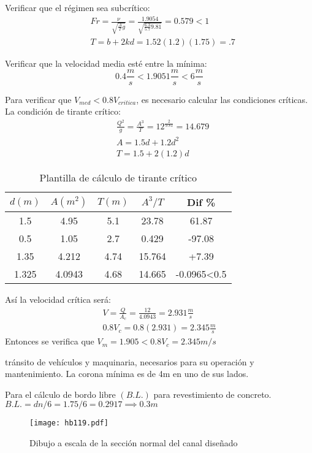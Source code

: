 Verificar que el régimen sea subcrítico:
\begin{align*}
    &Fr = \frac{\nu}{\sqrt{\frac{A}{T}g}} = \frac{1.9054}{\sqrt{ \frac{6.3}{5.7}9.81}} = 0.579 < 1\\
    &T = b + 2kd = 1.5 2(1.2)(1.75) = .7
\end{align*}

Verificar que la velocidad media esté entre la mínima:
\begin{equation*}
    0.4\frac{m}{s} < 1.9051 \frac{m}{s} < 6 \frac{m}{s}
\end{equation*}

Para verificar que $V_{med}<0.8 V_{critica}$, es necesario calcular las condiciones críticas.
    La condición de tirante crítico:
\begin{align*}
    &\frac{Q^2}{g} = \frac{A^3}{T} = 12^\frac{2}{9.81} = 14.679\\
    &A =1.5d + 1.2d^2\\
    &T = 1.5 + 2(1.2)d
\end{align*}
\begin{table}[h!]
    \centering
    \begin{tabular}{@{}ccccc@{}}
    \toprule
    $d(m)$ & $A(m^2)$ & $T(m)$ & $A^3/T$ & Dif \%      \\ \midrule
    1.5    & 4.95     & 5.1    & 23.78   & 61.87       \\
    0.5    & 1.05     & 2.7    & 0.429   & -97.08      \\
    1.35   & 4.212    & 4.74   & 15.764  & +7.39       \\
    1.325  & 4.0943   & 4.68   & 14.665  & -0.0965<0.5 \\ \bottomrule
    \end{tabular}
    \caption{Plantilla de cálculo de tirante crítico}
    \label{tabhb44}
\end{table}
Así la velocidad crítica será:
\begin{align*}
    V =\frac{Q}{A_c} = \frac{12}{4.0943} = 2.931 \frac{m}{s}\\
    0.8 V_c = 0.8(2.931) = 2.345 \frac{m}{s}
\end{align*}
Entonces se verifica que $V_m= 1.905<0.8V_c=2.345 m/s$

tránsito de vehículos y maquinaria, necesarios para su operación y mantenimiento. La corona mínima es de 4m en uno de sus lados.

Para el cálculo de bordo libre $(B.L.)$ para revestimiento de concreto.
$B.L. =dn/6=1.75/6=0.2917\implies 0.3m$

\begin{figure}[h!]
\centering
  \texttt{[image: hb119.pdf]}
  \caption{Dibujo a escala de la sección normal del canal diseñado}
  \label{hb119}
\end{figure}

